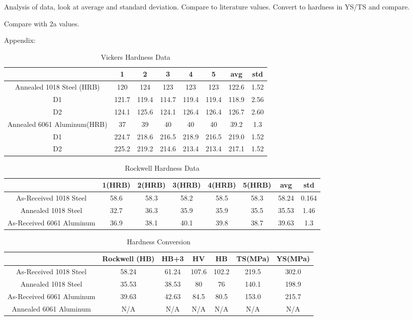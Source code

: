 \documentclass{article}
\begin{document}
Analysis of data, look at average and standard deviation. Compare to literature values. Convert to hardness in YS/TS and compare.

Compare with 2a values.

\clearpage

Appendix:\\

\begin{table}[h]
\centering
\caption{Vickers Hardness Data}
\begin{tabular}{||c | c | c | c | c | c | c | c||}
	\hline
	\ 	&
	1	&	2	&	3	&	4	&	5 & avg & std\\
	\hline\hline
	Annealed 1018 Steel	(HRB)	&
	120	&	124	&	123	&	123	&	123 & 122.6 & 1.52\\
	D1		&
	121.7	& 119.4 & 114.7 & 119.4 & 119.4 & 118.9 & 2.56\\
	D2		&
	124.1	& 125.6	& 124.1	& 126.4	& 126.4 & 126.7 & 2.60\\
	Annealed 6061 Aluminum(HRB)	&
	37	&	39	&	40	&	40	&	40 & 39.2 & 1.3\\
	D1		&
	224.7	& 218.6 & 216.5 & 218.9 & 216.5 & 219.0 & 1.52\\
	D2		&
	225.2	& 219.2 & 214.6 & 213.4 & 213.4 & 217.1 & 1.52\\
	\hline
\end{tabular}
\end{table}

\begin{table}[h]
\centering
\caption{Rockwell Hardness Data}
\begin{tabular}{||c | c | c | c | c | c | c | c||}
	\hline
	\ 	&
	1(HRB) & 2(HRB) & 3(HRB) & 4(HRB) & 5(HRB) & avg & std\\
	\hline\hline
	As-Received 1018 Steel		&
	58.6	&	58.3	&	58.2	&	58.5	&	58.3 & 58.24	& 0.164\\
	Annealed 1018 Steel		&
	32.7	&	36.3	&	35.9	&	35.9	&	35.5 & 35.53 	& 1.46\\
	As-Received 6061 Aluminum	&
	36.9	&	38.1	&	40.1	&	39.8	&	38.7 & 39.63 & 1.3\\
	\hline
\end{tabular}
\end{table}

\begin{table}[h]
\centering
\caption{Hardness Conversion}
\begin{tabular}{||c | c | c | c | c | c | c||}
	\hline
	\ 	&
	Rockwell (HB)& HB+3 & HV & HB & TS(MPa) & YS(MPa)\\
	\hline\hline
	As-Received 1018 Steel		&
	58.24	&	61.24	&	107.6	&	102.2	& 219.5	& 302.0\\
	Annealed 1018 Steel		&
	35.53	&	38.53	&	80	&	76	& 140.1	&	198.9\\
	As-Received 6061 Aluminum	&
	39.63	&	42.63	& 84.5	& 80.5	& 153.0	& 215.7 \\
	Annealed 6061 Aluminum	&
	N/A & N/A & N/A & N/A & N/A & N/A\\
	\hline
\end{tabular}
\end{table}
\end{document}
